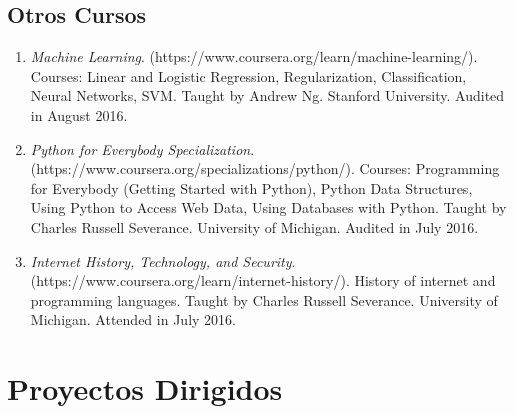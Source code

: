 \documentclass{article}
\begin{document}
\subsection*{Otros Cursos}

\begin{enumerate}
\item
{\it Machine Learning}.
(https://www.coursera.org/learn/machine-learning/).
Courses: Linear and Logistic Regression, Regularization, Classification, Neural Networks, SVM.
Taught by Andrew Ng.
Stanford University.
Audited in August 2016.

\item
{\it Python for Everybody Specialization}.
(https://www.coursera.org/specializations/python/).
Courses: Programming for Everybody (Getting Started with Python), Python Data Structures, Using Python to Access Web Data, Using Databases with Python.
Taught by Charles Russell Severance.
University of Michigan.
Audited in July 2016.

\item
{\it Internet History, Technology, and Security}.
(https://www.coursera.org/learn/internet-history/).
History of internet and programming languages.
Taught by Charles Russell Severance.
University of Michigan.
Attended in July 2016.
\end{enumerate}

\newpage


\section*{Proyectos Dirigidos}
\end{document}

